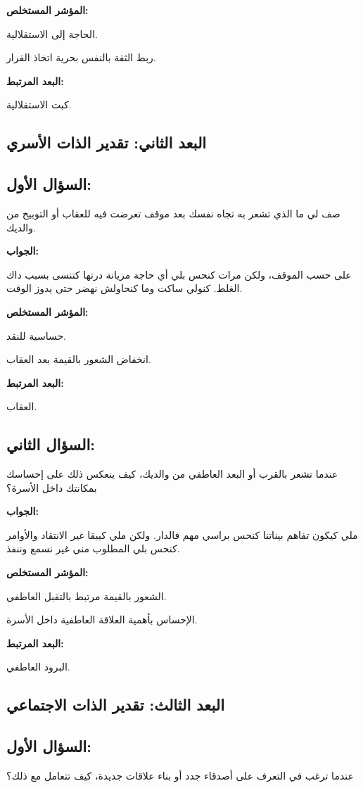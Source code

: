 \documentclass[12pt,oneside]{report}
\begin{document}
\noindent\textbf{المؤشر المستخلص:}\par
الحاجة إلى الاستقلالية.

ربط الثقة بالنفس بحرية اتخاذ القرار.

\noindent\textbf{البعد المرتبط:}\par
كبت الاستقلالية.

\subsection*{البعد الثاني: تقدير الذات الأسري}
\subsection*{السؤال الأول:}
صف لي ما الذي تشعر به تجاه نفسك بعد موقف تعرضت فيه للعقاب أو التوبيخ من والديك.

\noindent\textbf{الجواب:}\par
على حسب الموقف، ولكن مرات كنحس بلي أي حاجة مزيانة درتها كتنسى بسبب داك الغلط. كنولي ساكت وما كنحاولش نهضر حتى يدوز الوقت.

\noindent\textbf{المؤشر المستخلص:}\par
حساسية للنقد.

انخفاض الشعور بالقيمة بعد العقاب.

\noindent\textbf{البعد المرتبط:}\par
العقاب.

\subsection*{السؤال الثاني:}
عندما تشعر بالقرب أو البعد العاطفي من والديك، كيف ينعكس ذلك على إحساسك بمكانتك داخل الأسرة؟

\noindent\textbf{الجواب:}\par
ملي كيكون تفاهم بيناتنا كنحس براسي مهم فالدار. ولكن ملي كيبقا غير الانتقاد والأوامر كنحس بلي المطلوب مني غير نسمع وننفذ.

\noindent\textbf{المؤشر المستخلص:}\par
الشعور بالقيمة مرتبط بالتقبل العاطفي.

الإحساس بأهمية العلاقة العاطفية داخل الأسرة.

\noindent\textbf{البعد المرتبط:}\par
البرود العاطفي.

\subsection*{البعد الثالث: تقدير الذات الاجتماعي}
\subsection*{السؤال الأول:}
عندما ترغب في التعرف على أصدقاء جدد أو بناء علاقات جديدة، كيف تتعامل مع ذلك؟
\end{document}
